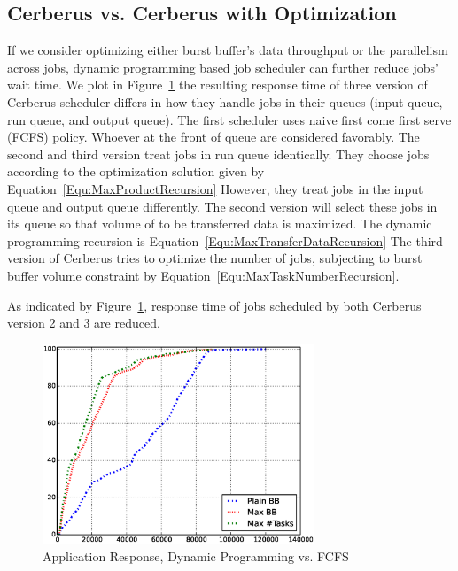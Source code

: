 \subsection{Cerberus vs. Cerberus with Optimization}
If we consider optimizing either burst buffer's data throughput or the parallelism across jobs,
dynamic programming based job scheduler can further reduce jobs' wait time.
We plot in Figure~\ref{Fig:DPvsFIFOResponse} the resulting response time of
three version of Cerberus scheduler differs in
how they handle jobs in their queues (input queue, run queue, and output queue).
The first scheduler uses naive first come first serve (FCFS) policy.
Whoever at the front of queue are considered favorably.
The second and third version treat jobs in run queue identically.
They choose jobs according to the optimization solution given by Equation~\ref{Equ:MaxProductRecursion}
However, they treat jobs in the input queue and output queue differently.
The second version will select these jobs in its queue so that
volume of to be transferred data is maximized.
The dynamic programming recursion is Equation~\ref{Equ:MaxTransferDataRecursion}
The third version of Cerberus tries to optimize the number of jobs,
subjecting to burst buffer volume constraint by Equation~\ref{Equ:MaxTaskNumberRecursion}.

As indicated by Figure~\ref{Fig:DPvsFIFOResponse}, response time of
jobs scheduled by both Cerberus version 2 and 3 are reduced.




\begin{figure}[!t]
\centering
\includegraphics[width=3.2in]{DrawDPvsFIFO/1000jobs_dp_vs_fifo_response}
\caption{Application Response, Dynamic Programming vs. FCFS}
\label{Fig:DPvsFIFOResponse}
\end{figure}


